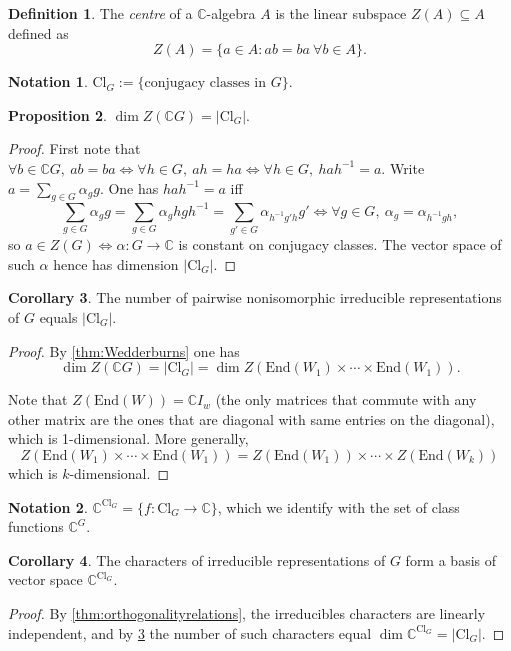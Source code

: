 \documentclass[a4paper]{article}
\newcommand{\C}{\mathbb{C}}
\newcommand{\Cl}{\text{Cl}}
\newcommand{\End}{\text{End}}
\theoremstyle{definition}
\newtheorem{defn}{Definition}[subsection]
\newtheorem{prop}[defn]{Proposition}
\newtheorem{coro}[defn]{Corollary}
\newtheorem*{notation}{Notation}
\begin{document}
\begin{defn}
The \textit{centre} of a $\C$-algebra $A$ is the linear subspace $Z(A)\subseteq A$ defined as
\[
Z(A)=\{a\in A:ab=ba\ \forall b\in A\}.
\]
\end{defn}
\begin{notation}
$\Cl_G:=\{\text{conjugacy classes in }G\}$.
\end{notation}
\begin{prop}
$\dim Z(\C G)=|\Cl_G|$.
\end{prop}
\begin{proof}
First note that $\forall b\in \C G,\ ab=ba\iff \forall h\in G,\ ah=ha\iff \forall h\in G,\ hah^{-1}=a$. Write $a=\sum_{g\in G}\alpha_g g$. One has $hah^{-1}=a$ iff
\[
\sum_{g\in G}\alpha_g g=\sum_{g\in G}\alpha_g hgh^{-1}=\sum_{g'\in G}\alpha_{h^{-1}g'h}g' \iff \forall g\in G,\ \alpha_g=\alpha_{h^{-1}gh},
\]
so $a\in Z(G)\iff\alpha:G\rightarrow\C$ is constant on conjugacy classes. The vector space of such $\alpha$ hence has dimension $|\Cl_G|$.
\end{proof}

\begin{coro}
\label{coro:nofpairwisenonisoirredrepofGisnofclG}
The number of pairwise nonisomorphic irreducible representations of $G$ equals $|\Cl_G|$.
\end{coro}
\begin{proof}
By \ref{thm:Wedderburns} one has
\[
\dim Z(\C G)=|\Cl_G|=\dim Z(\End(W_1)\times\cdots\times\End(W_1)).
\]

Note that $Z(\End(W))=\C I_w$ (the only matrices that commute with any other matrix are the ones that are diagonal with same entries on the diagonal), which is 1-dimensional. More generally,
\[
Z(\End(W_1)\times\cdots\times\End(W_1))=Z(\End(W_1))\times\cdots\times Z(\End(W_k))
\]
which is $k$-dimensional.
\end{proof}

\begin{notation}
$\C^{\Cl_G}=\{f:\Cl_G\rightarrow \C\}$, which we identify with the set of class functions $\C^G$.
\end{notation}

\begin{coro}
The characters of irreducible representations of $G$ form a basis of vector space $\C^{\Cl_G}$.
\end{coro}
\begin{proof}
By \ref{thm:orthogonalityrelations}, the irreducibles characters are linearly independent, and by \ref{coro:nofpairwisenonisoirredrepofGisnofclG} the number of such characters equal $\dim \C^{\Cl_G}=|\Cl_G|$.
\end{proof}
\end{document}
